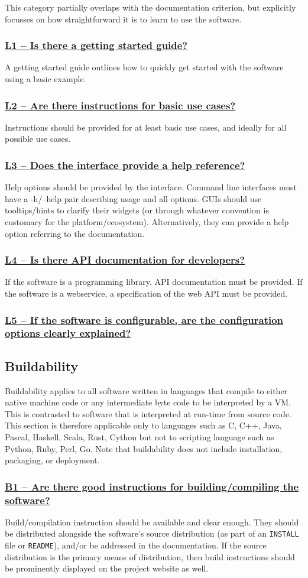 \documentclass[a4paper,11pt]{article}
\newcommand{\indicator}[1]{\subsubsection*{\underline{#1}}}
\begin{document}
This category partially overlaps with the documentation criterion, but explicitly
focusses on how straightforward it is to learn to use the software.

\indicator{L1 -- Is there a getting started guide?}

A getting started guide outlines how to quickly get started with the software
using a basic example.

\indicator{L2 -- Are there instructions for basic use cases?}

Instructions should be provided for at least basic use cases, and ideally for
all possible use cases.

\indicator{L3 -- Does the interface provide a help reference?}

Help options should be provided by the interface. Command line interfaces must
have a -h/--help pair describing usage and all options. GUIs should use tooltips/hints to clarify
their widgets (or through whatever convention is customary for the
platform/ecosystem). Alternatively, they can provide a help option referring to
the documentation.

\indicator{L4 -- Is there API documentation for developers?}

If the software is a programming library. API documentation must be provided.
If the software is a webservice, a specification of the web API must be provided.

\indicator{L5 -- If the software is configurable, are the configuration
options clearly explained?}


\subsection{Buildability}

Buildability applies to all software written in languages that compile to
either native machine code or any intermediate byte code to be interpreted by a VM.
This is contrasted to software that is interpreted at run-time from source
code. This section is therefore applicable only to languages such as C, C++,
Java, Pascal, Haskell, Scala, Rust, Cython but not to scripting language such
as Python, Ruby, Perl, Go.  Note that buildability does not include
installation, packaging, or deployment.

\indicator{B1 -- Are there good instructions for building/compiling the software?}

Build/compilation instruction should be available and clear enough. They should
be distributed alongside the software's source distribution (as part of an
\texttt{INSTALL} file or \texttt{README}), and/or be addressed in the documentation. If the
source distribution is the primary means of distribution, then build
instructions should be prominently displayed on the project website as well.
\end{document}
